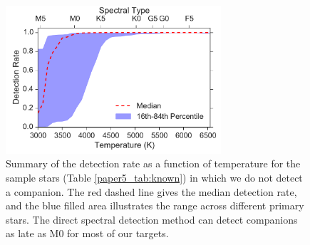 \begin{figure}
        \centering
        \includegraphics[width=80mm]{Figures/paper5_DetectionRate.pdf}

         \caption{Summary of the detection rate as a function of temperature for the sample stars (Table \ref{paper5_tab:known}) in which we do not detect a companion. The red dashed line gives the median detection rate, and the blue filled area illustrates the range across different primary stars. The direct spectral detection method can detect companions as late as M0 for most of our targets.}
         \label{paper5_fig:sensitivity}
\end{figure}





